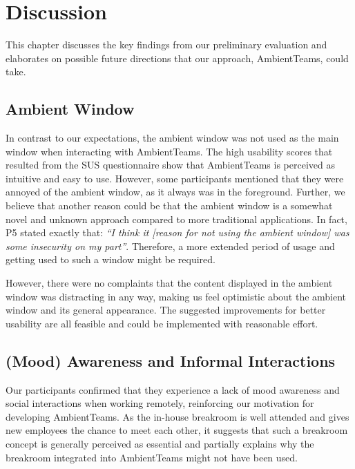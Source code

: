 \chapter{Discussion}
\label{chapter:discussion}
This chapter discusses the key findings from our preliminary evaluation and elaborates on possible future directions that our approach, AmbientTeams, could take.

\section{Ambient Window}
In contrast to our expectations, the ambient window was not used as the main window when interacting with AmbientTeams. The high usability scores that resulted from the SUS questionnaire show that AmbientTeams is perceived as intuitive and easy to use. 
However, some participants mentioned that they were annoyed of the ambient window, as it always was in the foreground. Further, we believe that another reason could be that the ambient window is a somewhat novel and unknown approach compared to more traditional applications. In fact, P5 stated exactly that: \textit{\enquote{I think it [reason for not using the ambient window] was some insecurity on my part}}. Therefore, a more extended period of usage and getting used to such a window might be required.

However, there were no complaints that the content displayed in the ambient window was distracting in any way, making us feel optimistic about the ambient window and its general appearance. The suggested improvements for better usability are all feasible and could be implemented with reasonable effort.

\section{(Mood) Awareness and Informal Interactions}
Our participants confirmed that they experience a lack of mood awareness and social interactions when working remotely, reinforcing our motivation for developing AmbientTeams. As the in-house breakroom is well attended and gives new employees the chance to meet each other, it suggests that such a breakroom concept is generally perceived as essential and partially explains why the breakroom integrated into AmbientTeams might not have been used. 


